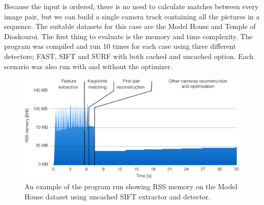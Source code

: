 Because the input is ordered, there is no need to calculate matches between every image pair, but we can build a single camera track containing all the pictures in a sequence. The suitable datasets for this case are the Model House and Temple of Dioskouroi. The first thing to evaluate is the memory and time complexity. The program was compiled and run 10 times for each case using three different detectors; FAST, SIFT and SURF with both cached and uncached option. Each scenario was also run with and without the optimizer. 

\begin{figure}[!htbp]
	\begin{center}
		\includegraphics[keepaspectratio,width=\textwidth]{fig/exp_model_house_memory.pdf}
	\end{center}
	\caption{An example of the program run showing RSS memory on the Model House dataset using uncached SIFT extractor and detector.}
	\label{fig:rss_memory}
\end{figure} 

